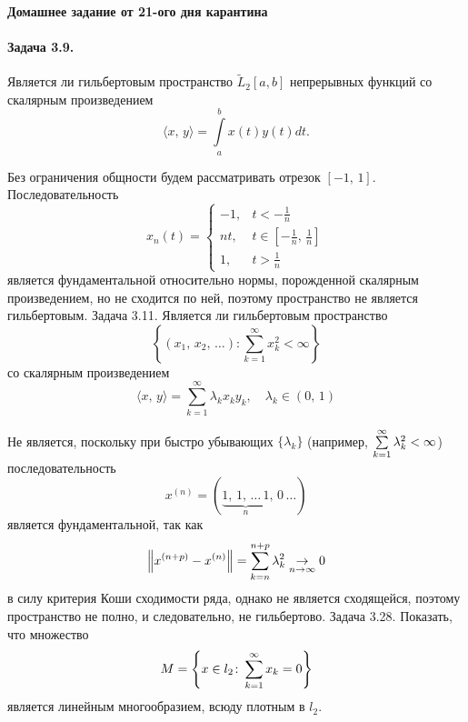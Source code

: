 \documentclass[16pt]{article}
\newenvironment{Sol}{\par\noindent{\it Решение:}}
\newcommand\Sum[2]{\sum\limits_{#1}^{#2}}
\newcommand\Scal[2]{\langle #1,\, #2 \rangle}
\newcommand\Norm[1]{\left\| #1 \right\|}
\newcommand\Int[2]{\int\limits_{#1}^{#2}}
\begin{document}
\paragraph{Домашнее задание от 21-ого дня карантина}
\paragraph{Задача 3.9.} Является ли гильбертовым пространство $\tilde{L}_2[a,b]$ непрерывных функций со
скалярным произведением
$$\Scal{x}{y} = \Int{a}{b}x(t)y(t)dt.$$ 


\begin{Sol}
Без ограничения общности будем рассматривать отрезок $[-1,\,1]$. \\
Последовательность
$$x_n(t) =
\begin{cases}
-1, & t < -\frac{1}{n}\\
nt, & t \in \left[-\frac{1}{n},\,\frac{1}{n}\right]\\
1, & t > \frac{1}{n}
\end{cases}
$$
является фундаментальной относительно нормы, порожденной скалярным произведением, но не сходится по ней,
поэтому пространство не является гильбертовым.
\end{Sol}


\paragraph{Задача 3.11.} Является ли гильбертовым пространство
$$\left\{(x_1, \,x_2,\, \ldots)\colon \sum_{k=1}^\infty x_k^2 < \infty\right\}$$
со скалярным произведением
$$\Scal{x}{y} = \sum_{k=1}^\infty \lambda_k x_k y_k, \quad \lambda_k \in (0,\,1)$$

\begin{Sol}
Не является, поскольку при быстро убывающих $\{\lambda_k\}$ (например, $\Sum{k=1}{\infty} \lambda_k^2 < \infty$)
последовательность 
$$x^{(n)} = (\underbrace{1,\,1,\,\ldots\,1}_n,\,0\,\ldots)$$
является фундаментальной, так как 
$$\Norm{x^{(n+p)}-x^{(n)}} = \Sum{k=n}{n+p}\lambda_k^2 \underset{n\to\infty}{\to} 0$$
в силу критерия Коши сходимости ряда, однако не является сходящейся, поэтому пространство не полно, и следовательно, 
не гильбертово.
\end{Sol}

\paragraph{Задача 3.28.} Показать, что множество 
$$M = \left\{x \in l_2\colon \Sum{k=1}{\infty}x_k = 0\right\}$$
является линейным многообразием, всюду плотным в $l_2$.
\end{document}
